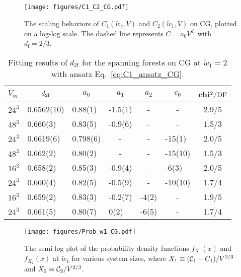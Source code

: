 \begin{figure}[ht]
	\centering
	\vspace{3ex}
	\texttt{[image: figures/C1\_C2\_CG.pdf]}
	\caption{The scaling behaviors of $C_1(\tilde{w}_c, V)$ and $C_2(\tilde{w}_1, V)$ on CG, plotted on a log-log scale. The dashed line 
	represents $C = a_0 V^{d_{\text{f}}}$ with $d_\text{f} = 2/3$.}
	\label{fig:C1_C2_CG}
\end{figure}

\begin{table}[htb]
\centering
\vspace{3ex}
\caption{Fitting results of ${d_{2\textrm{f}}}$ for the spanning forests on CG at $\tilde{w}_1 = 2$ with ansatz Eq.~\eqref{eq:C1_ansatz_CG}.}
\label{tab:C2_w1_COM} 
\begin{tabular}{|llllllc|}
\hline 
$V_{m}$   &\multicolumn{1}{c}{${d_{2\textrm{f}}}$}   &\multicolumn{1}{c}{$a_0$}    
&\multicolumn{1}{c}{$a_1$}  &\multicolumn{1}{c}{$a_2$} &\multicolumn{1}{c}{$c_0$}
& chi$^2/{\rm DF}$     \\
\hline 
$24^3$    &0.6562(10)   &0.88(1)    &-1.5(1)    &\multicolumn{1}{c}{-} &\multicolumn{1}{c}{-}      &2.9/5\\ 
$48^3$    &0.660(3)     &0.83(5)    &-0.9(6)    &\multicolumn{1}{c}{-} &\multicolumn{1}{c}{-}      &1.5/3\\ 

$24^3$    &0.6619(6)    &0.798(6)   &\multicolumn{1}{c}{-} &\multicolumn{1}{c}{-}      &-15(1)     &2.0/5\\ 
$48^3$    &0.662(2)     &0.80(2)    &\multicolumn{1}{c}{-} &\multicolumn{1}{c}{-}      &-15(10)    &1.5/3\\ 

$16^3$    &0.658(2)     &0.85(3)    &-0.9(4)    &\multicolumn{1}{c}{-}     &-6(3)      &2.0/5\\ 
$24^3$    &0.660(4)     &0.82(5)    &-0.5(9)    &\multicolumn{1}{c}{-}     &-10(10)    &1.7/4\\ 

$16^3$    &0.659(2)     &0.83(3)    &-0.2(7)     &-4(2)       &\multicolumn{1}{c}{-}      &1.9/5\\ 
$24^3$    &0.661(5)     &0.80(7)    &0(2)        &-6(5)       &\multicolumn{1}{c}{-}      &1.7/4\\ 
\hline 
\end{tabular} 
\vspace{3ex}
\end{table} 


\begin{figure}[b]
	\centering
	\texttt{[image: figures/Prob\_w1\_CG.pdf]}
	\caption{The semi-log plot of the probability density functions $f_{X_1}(x)$ and $f_{X_2}(x)$ at $\tilde{w}_1$ for various system sizes,
	where $X_1 \equiv ({\mathcal C}_1 - C_1)/V^{2/3}$ and $X_2 \equiv {\mathcal C}_2/V^{2/3}$.}
	\label{fig:prob_w1_CG}
\end{figure}

